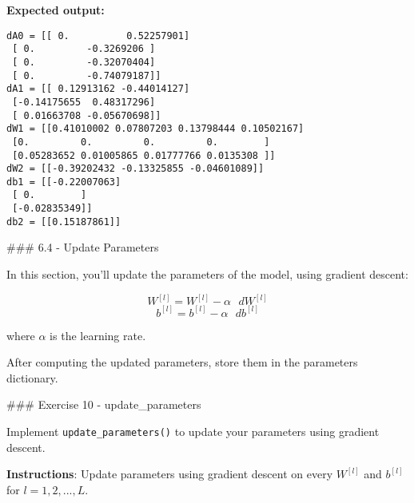\documentclass[11pt]{article}
\begin{document}
    \textbf{Expected output:}

\begin{verbatim}
dA0 = [[ 0.          0.52257901]
 [ 0.         -0.3269206 ]
 [ 0.         -0.32070404]
 [ 0.         -0.74079187]]
dA1 = [[ 0.12913162 -0.44014127]
 [-0.14175655  0.48317296]
 [ 0.01663708 -0.05670698]]
dW1 = [[0.41010002 0.07807203 0.13798444 0.10502167]
 [0.         0.         0.         0.        ]
 [0.05283652 0.01005865 0.01777766 0.0135308 ]]
dW2 = [[-0.39202432 -0.13325855 -0.04601089]]
db1 = [[-0.22007063]
 [ 0.        ]
 [-0.02835349]]
db2 = [[0.15187861]]
\end{verbatim}

    \#\#\# 6.4 - Update Parameters

In this section, you'll update the parameters of the model, using
gradient descent:

\[ W^{[l]} = W^{[l]} - \alpha \text{ } dW^{[l]} \tag{16}\]
\[ b^{[l]} = b^{[l]} - \alpha \text{ } db^{[l]} \tag{17}\]

where \(\alpha\) is the learning rate.

After computing the updated parameters, store them in the parameters
dictionary.

    \#\#\# Exercise 10 - update\_parameters

Implement \texttt{update\_parameters()} to update your parameters using
gradient descent.

\textbf{Instructions}: Update parameters using gradient descent on every
\(W^{[l]}\) and \(b^{[l]}\) for \(l = 1, 2, ..., L\).
\end{document}
